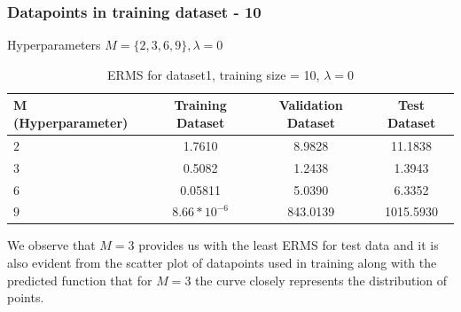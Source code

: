 \documentclass[11pt]{article}
\begin{document}
\subsubsection{Datapoints in training dataset - 10}
Hyperparameters $M = \{2,3,6,9\}, \lambda = 0$
\begin{table}[h!]
\label{tab:tab1.1.1}
\begin{center}
\begin{tabular}{|l|c|c|c|}
\hline
\textbf{M (Hyperparameter)} & \textbf{Training Dataset} & \textbf{Validation Dataset} &\textbf{Test Dataset}\\
\hline
$2$ & 1.7610 & 8.9828 & 11.1838\\
\hline
$3$ & 0.5082 & 1.2438 & 1.3943\\
\hline
$6$ & 0.05811 & 5.0390 & 6.3352\\
\hline
$9$ & $8.66*10^{-6}$ & 843.0139 & 1015.5930\\
\hline
\end{tabular}
\caption{ERMS for dataset1, training size = 10, $\lambda = 0$}
\end{center}
\end{table}

We observe that $M =3$ provides us with the least ERMS for test data and it is also evident from the scatter plot of datapoints used in training along with the predicted function that for $M =3$ the curve closely represents the distribution of points.\\
\end{document}
